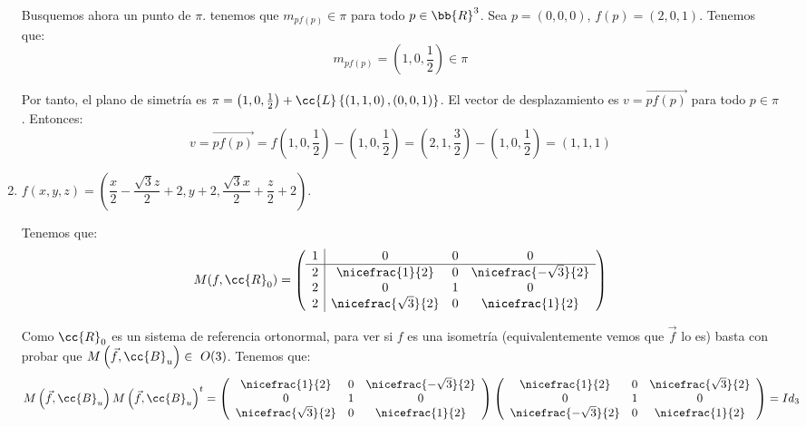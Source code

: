\begin{ejercicio}
\begin{enumerate}
        Busquemos ahora un punto de $\pi$. tenemos que $m_{pf(p)}\in \pi$ para todo $p\in \bb{R}^3$. Sea $p=(0,0,0)$, $f(p)=(2,0,1)$. Tenemos que:
        \begin{equation*}
            m_{pf(p)} = \left(1,0,\frac{1}{2}\right)\in \pi
        \end{equation*}

        Por tanto, el plano de simetría es $\pi=\left(1,0,\frac{1}{2}\right) + \cc{L}\left\{\left(1,1,0\right), \left(0,0,1\right)\right\}$. El vector de desplazamiento es $v=\vec{pf(p)}$ para todo $p\in \pi$. Entonces:
        \begin{equation*}
            v = \vec{pf(p)} = f\left(1,0,\frac{1}{2}\right) - \left(1,0,\frac{1}{2}\right)
            = \left(2,1,\frac{3}{2}\right)-\left(1,0,\frac{1}{2}\right)
            = \left(1,1,1\right)
        \end{equation*}
        
        \item $f\left(x, y, z\right) = \left(\dfrac{x}{2} -\dfrac{\sqrt{3} z}{2} + 2, y + 2,\dfrac{\sqrt{3} x}{2} + \dfrac{z}{2} + 2\right)$.

        Tenemos que:
        \begin{equation*}
            M(f,\cc{R}_0) = \left(\begin{array}{c|ccc}
                1 & 0 & 0 & 0 \\ \hline
                2 & \nicefrac{1}{2} & 0 & \nicefrac{-\sqrt{3}}{2} \\
                2 & 0 & 1 & 0 \\
                2 & \nicefrac{\sqrt{3}}{2} & 0 & \nicefrac{1}{2} 
            \end{array}\right)
        \end{equation*}

        Como $\cc{R}_0$ es un sistema de referencia ortonormal, para ver si $f$ es una isometría (equivalentemente vemos que $\vec{f}$ lo es) basta con probar que $M\left(\vec{f}, \cc{B}_u\right)\in~O(3)$. Tenemos que:
        \begin{equation*}
            M\left(\vec{f},\cc{B}_u\right)M\left(\vec{f},\cc{B}_u\right)^t
            = 
            \left(
            \begin{array}{ccc}
                \nicefrac{1}{2} & 0 & \nicefrac{-\sqrt{3}}{2} \\
                0 & 1 & 0 \\
                \nicefrac{\sqrt{3}}{2} & 0 & \nicefrac{1}{2} 
            \end{array}
            \right)
            \left(
            \begin{array}{ccc}
                \nicefrac{1}{2} & 0 & \nicefrac{\sqrt{3}}{2} \\
                0 & 1 & 0 \\
                \nicefrac{-\sqrt{3}}{2} & 0 & \nicefrac{1}{2} 
            \end{array}
            \right)
            = Id_3
        \end{equation*}


\end{enumerate}
\end{ejercicio}
